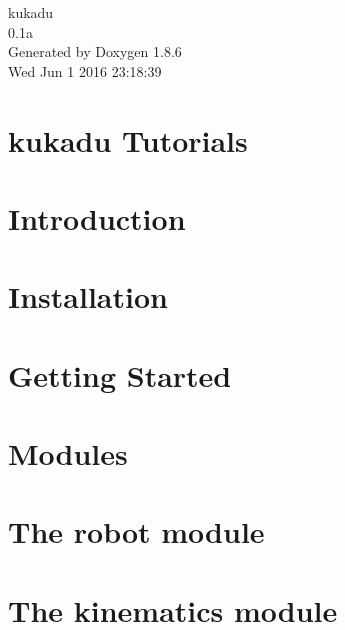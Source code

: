 \documentclass[twoside]{book}
\newcommand{\clearemptydoublepage}{%
  \newpage{\pagestyle{empty}\cleardoublepage}%
}
\begin{document}
\hypersetup{pageanchor=false}
\begin{titlepage}
\vspace*{7cm}
\begin{center}%
{\Large kukadu \\[1ex]\large 0.\-1a }\\
\vspace*{1cm}
{\large Generated by Doxygen 1.8.6}\\
\vspace*{0.5cm}
{\small Wed Jun 1 2016 23:18:39}\\
\end{center}
\end{titlepage}
\clearemptydoublepage
\tableofcontents
\clearemptydoublepage
{}
\hypersetup{pageanchor=true}

\chapter{kukadu Tutorials}
\label{index}\hypertarget{index}{}
\chapter{Introduction}
\label{introductionpage}
\hypertarget{introductionpage}{}

\chapter{Installation}
\label{installationpage}
\hypertarget{installationpage}{}

\chapter{Getting Started}
\label{gettingstartedpage}
\hypertarget{gettingstartedpage}{}

\chapter{Modules}
\label{modulespage}
\hypertarget{modulespage}{}

\chapter{The robot module}
\label{robotpage}
\hypertarget{robotpage}{}

\chapter{The kinematics module}
\label{kinematicspage}
\hypertarget{kinematicspage}{}

\end{document}
